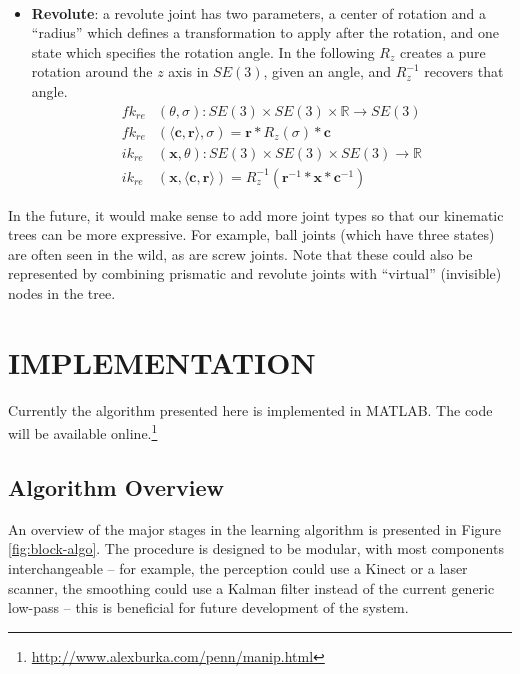 \documentclass[letterpaper, 10 pt, conference]{ieeeconf}  %
\def\xse{\bm}            \def\xsestr{in boldface}
\begin{document}
\begin{itemize}
\begin{align}
    \end{align}
  \item \textbf{Revolute}: a revolute joint has two parameters, a center of rotation and a ``radius'' which defines a transformation to apply after the rotation, and one state which specifies the rotation angle. In the following $R_z$ creates a pure rotation around the $z$ axis in $SE(3)$, given an angle, and $R_z^{-1}$ recovers that angle.
    \begin{align}
      fk_{re}&(\theta, \sigma) : SE(3) \times SE(3) \times \mathbb{R} \longrightarrow SE(3) \\
      fk_{re}&(\langle \xse{c}, \xse{r} \rangle, \sigma) = \xse{r} * R_z(\sigma) * \xse{c} \nonumber\\
      ik_{re}&(\xse{x}, \theta) : SE(3) \times SE(3) \times SE(3) \longrightarrow \mathbb{R} \\
      ik_{re}&(\xse{x}, \langle \xse{c}, \xse{r} \rangle) = R_z^{-1}(\xse{r}^{-1}*\xse{x}*\xse{c}^{-1}) \nonumber
    \end{align}
\end{itemize}

In the future, it would make sense to add more joint types so that our kinematic trees can be more expressive. For example, ball joints (which have three states) are often seen in the wild, as are screw joints. Note that these could also be represented by combining prismatic and revolute joints with ``virtual'' (invisible) nodes in the tree.

\section{IMPLEMENTATION} \label{sec:implementation}
Currently the algorithm presented here is implemented in MATLAB. The code will be available online.\footnote{\url{http://www.alexburka.com/penn/manip.html}}

\subsection{Algorithm Overview} \label{sec:algorithm}
An overview of the major stages in the learning algorithm is presented in Figure \ref{fig:block-algo}. The procedure is designed to be modular, with most components interchangeable -- for example, the perception could use a Kinect or a laser scanner, the smoothing could use a Kalman filter instead of the current generic low-pass -- this is beneficial for future development of the system.
\end{document}
